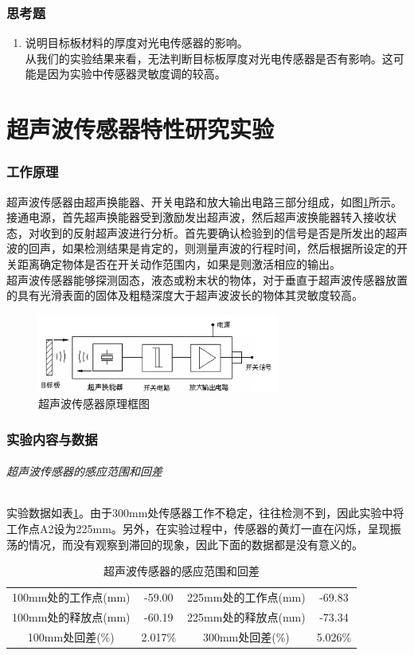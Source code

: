 	\section{思考题}
	\begin{enumerate}
	\item 说明目标板材料的厚度对光电传感器的影响。\\
	从我们的实验结果来看，无法判断目标板厚度对光电传感器是否有影响。这可能是因为实验中传感器灵敏度调的较高。
	\end{enumerate}

\part{超声波传感器特性研究实验}
\section{工作原理}
超声波传感器由超声换能器、开关电路和放大输出电路三部分组成，如图\ref{fig:sp}所示。接通电源，首先超声换能器受到激励发出超声波，然后超声波换能器转入接收状态，对收到的反射超声波进行分析。首先要确认检验到的信号是否是所发出的超声波的回声，如果检测结果是肯定的，则测量声波的行程时间，然后根据所设定的开关距离确定物体是否在开关动作范围内，如果是则激活相应的输出。\\
超声波传感器能够探测固态，液态或粉末状的物体，对于垂直于超声波传感器放置的具有光滑表面的固体及粗糙深度大于超声波波长的物体其灵敏度较高。
\begin{figure}[htbp]
\centering
\includegraphics[width=8cm]{resource/sp.png}
\caption{超声波传感器原理框图}
\label{fig:sp}
\end{figure}

\section{实验内容与数据}
\paragraph{超声波传感器的感应范围和回差}
实验数据如表\ref{tab:lt}。由于300mm处传感器工作不稳定，往往检测不到，因此实验中将工作点A2设为225mm。另外，在实验过程中，传感器的黄灯一直在闪烁，呈现振荡的情况，而没有观察到滞回的现象，因此下面的数据都是没有意义的。
\begin{table}[htbp]
	\centering
	\begin{tabular}{|c|c||c|c|}
		\hline
		100mm处的工作点(mm) & -59.00 & 225mm处的工作点(mm) & -69.83 \\
		100mm处的释放点(mm) & -60.19 & 225mm处的释放点(mm) & -73.34 \\
		100mm处回差(\%) & 2.017\% & 300mm处回差(\%) & 5.026\% \\
		\hline
	\end{tabular}
	\caption{超声波传感器的感应范围和回差}
	\label{tab:lt}
\end{table}
